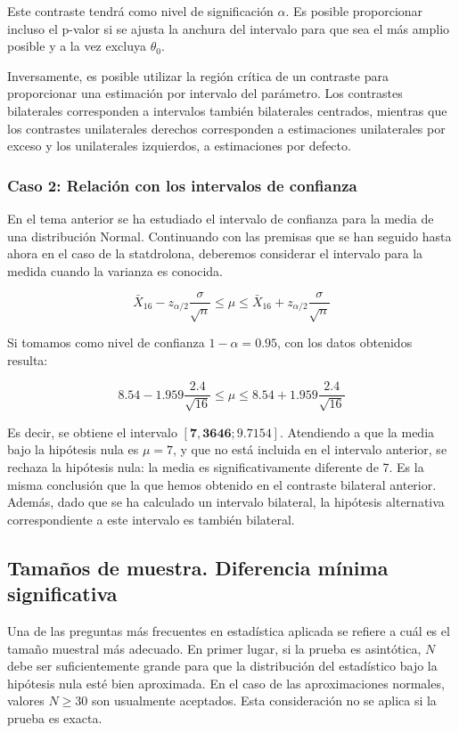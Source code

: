 \documentclass[
]{article}
\begin{document}
Este contraste tendrá como nivel de significación \(\alpha\). Es posible proporcionar incluso el p-valor si se ajusta la anchura del intervalo para que sea el más amplio posible y a la vez excluya \(\theta_{0}\).

Inversamente, es posible utilizar la región crítica de un contraste para proporcionar una estimación por intervalo del parámetro. Los contrastes bilaterales corresponden a intervalos también bilaterales centrados, mientras que los contrastes unilaterales derechos corresponden a estimaciones unilaterales por exceso y los unilaterales izquierdos, a estimaciones por defecto.

\subsubsection{Caso 2: Relación con los intervalos de confianza}\label{caso-2-relaciuxf3n-con-los-intervalos-de-confianza}

En el tema anterior se ha estudiado el intervalo de confianza para la media de una distribución Normal. Continuando con las premisas que se han seguido hasta ahora en el caso de la statdrolona, deberemos considerar el intervalo para la medida cuando la varianza es conocida.

\[
\bar{X}_{16}-z_{\alpha / 2} \frac{\sigma}{\sqrt{n}} \leq \mu \leq \bar{X}_{16}+z_{\alpha / 2} \frac{\sigma}{\sqrt{n}}
\]

Si tomamos como nivel de confianza \(1-\alpha=0.95\), con los datos obtenidos resulta:

\[
8.54-1.959 \frac{2.4}{\sqrt{16}} \leq \mu \leq 8.54+1.959 \frac{2.4}{\sqrt{16}}
\]

Es decir, se obtiene el intervalo \([\mathbf{7 , 3 6 4 6};9.7154]\). Atendiendo a que la media bajo la hipótesis nula es \(\mu=7\), y que no está incluida en el intervalo anterior, se rechaza la hipótesis nula: la media es significativamente diferente de 7. Es la misma conclusión que la que hemos obtenido en el contraste bilateral anterior. Además, dado que se ha calculado un intervalo bilateral, la hipótesis alternativa correspondiente a este intervalo es también bilateral.

\subsection{Tamaños de muestra. Diferencia mínima significativa}\label{tamauxf1os-de-muestra.-diferencia-muxednima-significativa}

Una de las preguntas más frecuentes en estadística aplicada se refiere a cuál es el tamaño muestral más adecuado. En primer lugar, si la prueba es asintótica, \(N\) debe ser suficientemente grande para que la distribución del estadístico bajo la hipótesis nula esté bien aproximada. En el caso de las aproximaciones normales, valores \(N \geq 30\) son usualmente aceptados. Esta consideración no se aplica si la prueba es exacta.
\end{document}
